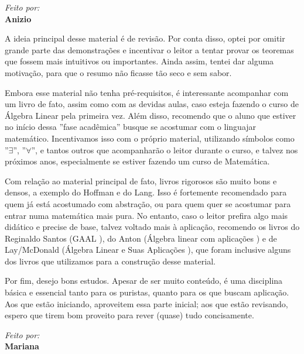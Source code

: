 \documentclass[../main.tex]{subfiles}
\begin{document}
	\vfill 
	
	\begin{flushright}
		\textit{Feito por:}\\
		\textbf{Anizio}
	\end{flushright}
	
	\newpage
	A ideia principal desse material é de revisão. Por conta disso, optei por omitir grande parte das demonstrações e incentivar o leitor a tentar provar os teoremas que fossem mais intuitivos ou importantes. Ainda assim, tentei dar alguma motivação, para que o resumo não ficasse tão seco e sem sabor.
	
	Embora esse material não tenha pré-requisitos, é interessante acompanhar com um livro de fato, assim como com as devidas aulas, caso esteja fazendo o curso de Álgebra Linear pela primeira vez. Além disso, recomendo que o aluno que estiver no início dessa ''fase acadêmica'' busque se acostumar com o linguajar matemático. Incentivamos isso com o próprio material, utilizando símbolos como ''$\exists$'', ''$\forall$'', e tantos outros que acompanharão o leitor durante o curso, e talvez nos próximos anos, especialmente se estiver fazendo um curso de Matemática.
	
	Com relação ao material principal de fato, livros rigorosos são muito bons e densos, a exemplo do Hoffman e do Lang. Isso é fortemente recomendado para quem já está acostumado com abstração, ou para quem quer se acostumar para entrar numa matemática mais pura. No entanto, caso o leitor prefira algo mais didático e precise de base, talvez voltado mais à aplicação, recomendo os livros do Reginaldo Santos (GAAL \cite{santos}), do Anton (Álgebra linear com aplicações \cite{anton}) e de Lay/McDonald (Álgebra Linear e Suas Aplicações \cite{lay}), que foram inclusive alguns dos livros que utilizamos para a construção desse material.
	
	Por fim, desejo bons estudos. Apesar de ser muito conteúdo, é uma disciplina básica e essencial tanto para os puristas, quanto para os que buscam aplicação. Aos que estão iniciando, aproveitem essa parte inicial; aos que estão revisando, espero que tirem bom proveito para rever (quase) tudo concisamente.
	
	\vfill 
	
	\begin{flushright}
		\textit{Feito por:}\\
		\textbf{Mariana}
	\end{flushright}
	
\end{document}
